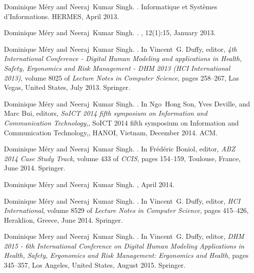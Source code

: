 \documentclass[ 12pt]{article}
\begin{document}
\begin{thebibliography}{100}
Dominique M{\'e}ry and Neeraj~Kumar Singh.
.
\newblock Informatique et Syst{\`e}mes d'Informations. {HERMES}, April 2013.

Dominique M{\'e}ry and Neeraj~Kumar Singh.
.
,
  12(1):15, January 2013.

Dominique M{\'e}ry and Neeraj~Kumar Singh.
.
\newblock In Vincent~G. Duffy, editor, {\em {4th International Conference -
  Digital Human Modeling and applications in Health, Safety, Ergonomics and
  Risk Management - DHM 2013 (HCI International 2013)}}, volume 8025 of {\em
  Lecture Notes in Computer Science}, pages 258--267, Las Vegas, United States,
  July 2013. {Springer}.

Dominique M{\'e}ry and Neeraj~Kumar Singh.
.
\newblock In Ngo~Hong Son, Yves Deville, and Marc Bui, editors, {\em {SoICT
  2014 fifth symposium on Information and Communication Technology,}}, SoICT
  2014 fifth symposium on Information and Communication Technology,, HANOI,
  Vietnam, December 2014. {ACM}.

Dominique M{\'e}ry and Neeraj~Kumar Singh.
.
\newblock In Fr{\'e}d{\'e}ric Boniol, editor, {\em {ABZ 2014 Case Study
  Track}}, volume 433 of {\em CCIS}, pages 154--159, Toulouse, France, June
  2014. {Springer}.

Dominique M{\'e}ry and Neeraj~Kumar Singh.
,
  April 2014.

Dominique M{\'e}ry and Neeraj~Kumar Singh.
.
\newblock In Vincent~G. Duffy, editor, {\em {HCI International}}, volume 8529
  of {\em Lecture Notes in Computer Science}, pages 415--426, Heraklion,
  Greece, June 2014. {Springer}.

Dominique Mery and Neeraj~Kumar Singh.
.
\newblock In Vincent~G. Duffy, editor, {\em {DHM 2015 - 6th International
  Conference on Digital Human Modeling Applications in Health, Safety,
  Ergonomics and Risk Management: Ergonomics and Health}}, pages 345--357, Los
  Angeles, United States, August 2015. {Springer}.


\end{thebibliography}
\end{document}
